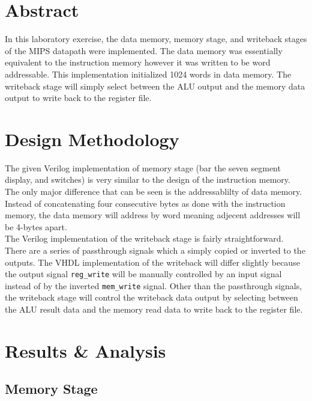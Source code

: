 \documentclass[CMPE]{../KGCOEReport}
\def\code#1{\texttt{#1}}
\begin{document}
    \maketitle
    \section*{Abstract}

    In this laboratory exercise, the data memory, memory stage, and writeback
    stages of the MIPS datapath were implemented. The data memory was essentially
    equivalent to the instruction memory however it was written to be word
    addressable. This implementation initialized 1024 words in data memory.
    The writeback stage will simply select between the ALU output and the memory
    data output to write back to the register file.

    \section*{Design Methodology}

    The given Verilog implementation of memory stage 
    (bar the seven segment display, and switches) is very similar to 
    the design of the instruction memory. The only major difference that can 
    be seen is the addressablilty of data memory. Instead of concatenating 
    four consecutive bytes as done with the instruction memory, the data 
    memory will address by word meaning adjecent addresses will be 4-bytes apart.
    \\
    
    The Verilog implementation of the writeback stage is fairly straightforward.
    There are a series of passthrough signals which a simply copied or inverted
    to the outputs. The VHDL implementation of the writeback will differ slightly
    because the output signal \code{reg\_write} will be manually controlled by 
    an input signal instead of by the inverted \code{mem\_write} signal. Other than
    the passthrough signals, the writeback stage will control the writeback data
    output by selecting between the ALU result data and the memory read data to
    write back to the register file.
	
    \section*{Results \& Analysis}

	\subsection*{Memory Stage}
\end{document}
